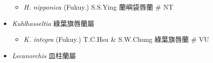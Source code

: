 \begin{itemize}
  \begin{itemize}
        \item[] \textit{H. nipponica} (Fukuy.) S.S.Ying  蘭嶼袋唇蘭  \# NT
  \end{itemize}
 \item[] \textit{Kuhlhasseltia} 綠葉旗唇蘭屬
                                
  \begin{itemize}
        \item[] \textit{K. integra} (Fukuy.) T.C.Hsu \& S.W.Chung  綠葉旗唇蘭  \# VU
  \end{itemize}
 \item[] \textit{Lecanorchis} 皿柱蘭屬
                                

\end{itemize}
